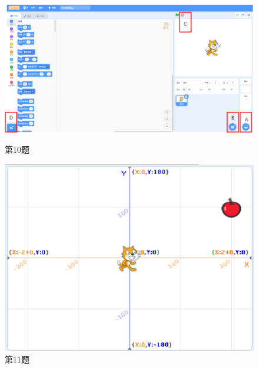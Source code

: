 \documentclass[10pt, a4paper]{article}
\begin{document}
\begin{enumerate}
        \begin{figure}[htbp]
            \centering
            \begin{minipage}[t]{.3\textwidth}
                \centering
                \includegraphics[width=\textwidth]{10.png}
                \caption*{第10题}
            \end{minipage}
            \begin{minipage}[t]{.2\textwidth}
                \centering
                \includegraphics[width=\textwidth]{11.png}
                \caption*{第11题}
            \end{minipage}
            \begin{minipage}[t]{.45\textwidth}
                \centering
                \begin{minipage}[t]{.45\textwidth}
                    \centering

\end{minipage}
\end{minipage}
\end{figure}
\end{enumerate}
\end{document}
